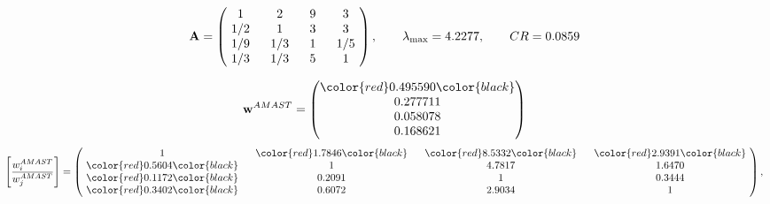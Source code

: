 \begin{example}
\begin{equation*}
\mathbf{A} =
\begin{pmatrix}
$\,\,$ 1 $\,\,$ & $\,\,$2$\,\,$ & $\,\,$9$\,\,$ & $\,\,$3 $\,\,$ \\
$\,\,$ 1/2$\,\,$ & $\,\,$ 1 $\,\,$ & $\,\,$3$\,\,$ & $\,\,$3 $\,\,$ \\
$\,\,$ 1/9$\,\,$ & $\,\,$ 1/3$\,\,$ & $\,\,$ 1 $\,\,$ & $\,\,$ 1/5 $\,\,$ \\
$\,\,$ 1/3$\,\,$ & $\,\,$ 1/3$\,\,$ & $\,\,$5$\,\,$ & $\,\,$ 1  $\,\,$ \\
\end{pmatrix},
\qquad
\lambda_{\max} =
4.2277,
\qquad
CR = 0.0859
\end{equation*}

\begin{equation*}
\mathbf{w}^{AMAST} =
\begin{pmatrix}
\color{red} 0.495590\color{black} \\
0.277711\\
0.058078\\
0.168621
\end{pmatrix}\end{equation*}
\begin{equation*}
\left[ \frac{{w}^{AMAST}_i}{{w}^{AMAST}_j} \right] =
\begin{pmatrix}
$\,\,$ 1 $\,\,$ & $\,\,$\color{red} 1.7846\color{black} $\,\,$ & $\,\,$\color{red} 8.5332\color{black} $\,\,$ & $\,\,$\color{red} 2.9391\color{black} $\,\,$ \\
$\,\,$\color{red} 0.5604\color{black} $\,\,$ & $\,\,$ 1 $\,\,$ & $\,\,$4.7817$\,\,$ & $\,\,$1.6470  $\,\,$ \\
$\,\,$\color{red} 0.1172\color{black} $\,\,$ & $\,\,$0.2091$\,\,$ & $\,\,$ 1 $\,\,$ & $\,\,$0.3444 $\,\,$ \\
$\,\,$\color{red} 0.3402\color{black} $\,\,$ & $\,\,$0.6072$\,\,$ & $\,\,$2.9034$\,\,$ & $\,\,$ 1  $\,\,$ \\
\end{pmatrix},
\end{equation*}


\end{example}
